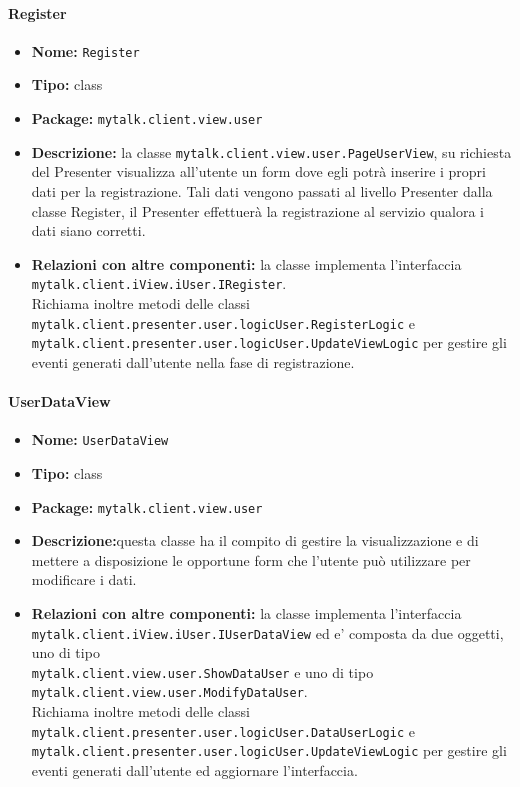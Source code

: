 {{\paragraph{Register}{
	\begin{itemize}
		\item [] \textbf{Nome:} \texttt{Register}
		\item [] \textbf{Tipo:} class
		\item [] \textbf{Package:} \texttt{mytalk.client.view.user}
		\item [] \textbf{Descrizione:} la classe \texttt{mytalk.client.view.user.PageUserView}, su richiesta del Presenter visualizza all'utente un form dove egli potrà inserire i propri dati per la registrazione. Tali dati vengono passati al livello Presenter dalla classe Register, il Presenter effettuerà la registrazione al servizio qualora i dati siano corretti.
		\item [] \textbf{Relazioni con altre componenti:} la classe implementa l'interfaccia\\ \texttt{mytalk.client.iView.iUser.IRegister}.\\ Richiama inoltre metodi delle classi\\ \texttt{mytalk.client.presenter.user.logicUser.RegisterLogic} e \\
		\texttt{mytalk.client.presenter.user.logicUser.UpdateViewLogic} per gestire gli eventi generati dall'utente nella fase di registrazione.
	\end{itemize}
}
\paragraph{UserDataView}{
	\begin{itemize}
		\item [] \textbf{Nome:} \texttt{UserDataView}
		\item [] \textbf{Tipo:} class
		\item [] \textbf{Package:} \texttt{mytalk.client.view.user}
		\item [] \textbf{Descrizione:}questa classe ha il compito di gestire la visualizzazione e di mettere a disposizione le opportune form che l'utente può utilizzare per modificare i dati.
		\item [] \textbf{Relazioni con altre componenti:} la classe implementa l'interfaccia\\ \texttt{mytalk.client.iView.iUser.IUserDataView} ed e' composta da due oggetti, uno di tipo\\ \texttt{mytalk.client.view.user.ShowDataUser} e uno di tipo\\ \texttt{mytalk.client.view.user.ModifyDataUser}.\\
		Richiama inoltre metodi delle classi \\
		\texttt{mytalk.client.presenter.user.logicUser.DataUserLogic} e \\
		\texttt{mytalk.client.presenter.user.logicUser.UpdateViewLogic}
		per gestire gli eventi generati dall'utente ed aggiornare l'interfaccia.
	\end{itemize}
}
}}
